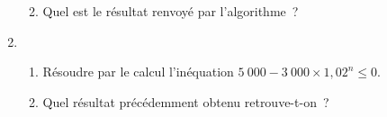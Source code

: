 \begin{enumerate}
\begin{enumerate}[label=\alph*.]
\begin{center}
\begin{extern}
\begin{tabularx}{0.25\linewidth}{|X|}
                    \end{tabularx}
               \end{extern}
          \end{center}
          \item Quel est le résultat renvoyé par l'algorithme~?
     \end{enumerate}
     \item
     \begin{enumerate}[label=\alph*.]
          \item Résoudre par le calcul l'inéquation $5~000 - 3~000 \times 1,02^n \leqslant 0$.
          \item Quel résultat précédemment obtenu retrouve-t-on~?
     \end{enumerate}
\end{enumerate}
